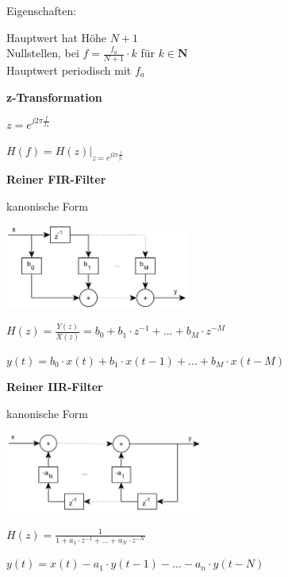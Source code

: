 Eigenschaften:

Hauptwert hat Höhe $N+1$\\
Nullstellen, bei $\displaystyle{
    f = \frac{f_a}{N+1} \cdot k
}$ für
$\displaystyle{
    k \in \mathbf{N}
}$\\
Hauptwert periodisch mit $f_a$

\textbf{z-Transformation}

$\displaystyle{
    z = e^{j2\pi \frac{f}{f_a}}
}$

$\displaystyle{
    H(f) = H(z) \bigg \vert _{z=e^{j2\pi \frac{f}{f_a}}}
}$

\textbf{Reiner FIR-Filter}

kanonische Form

\includegraphics[width=6cm]{img/fir.png}

$\displaystyle{
    H(z) = \frac{Y(z)}{X(z)} = b_0 + b_1 \cdot z^{-1} + ... + b_M \cdot z^{-M}
}$

$\displaystyle{
    y(t) = b_0 \cdot x(t) + b_1 \cdot x(t-1) + ... + b_M \cdot x(t-M)
}$

\textbf{Reiner IIR-Filter}

kanonische Form

\includegraphics[width=6.5cm]{img/iir.png}

$\displaystyle{
    H(z) = \frac{1}{1 + a_1 \cdot z^{-1} + ... + a_N \cdot z^{-N}}
}$

$\displaystyle{
    y(t) = x(t) - a_1 \cdot y(t-1) - ... - a_n \cdot y(t-N)
}$
